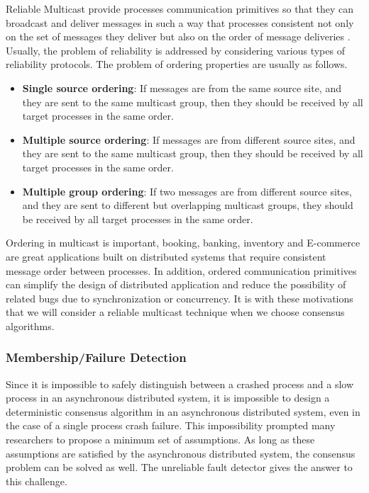\documentclass[12pt, a4paper]{article}
\begin{document}
Reliable Multicast provide processes communication primitives so that they can
broadcast and deliver messages in such a way that processes consistent not only
on the set of messages they deliver but also on the order of message deliveries
\cite{fritzke2001consensus}. Usually, the problem of reliability is addressed by
considering various types of reliability protocols. The problem of ordering
properties are usually as follows.\cite{garcia1991ordered}

\begin{itemize}
  \item \textbf{Single source ordering}: If messages are from the same source
  site, and they are sent to the same multicast group, then they should be
  received by all target processes in the same order.
  \item \textbf{Multiple source ordering}: If messages are from different
  source sites, and they are sent to the same multicast group,
  then they should be received by all target processes in the same order.
  \item \textbf{Multiple group ordering}: If two messages are from different
  source sites, and they are sent to different but overlapping multicast groups,
  they should be received by all target processes in the same order.
\end{itemize}

Ordering in multicast is important, booking, banking, inventory and E-commerce
are great applications built on distributed systems that require consistent
message order between processes. In addition, ordered communication primitives
can simplify the design of distributed application and reduce the possibility of
related bugs due to synchronization or concurrency\cite{garcia1991ordered}. It
is with these motivations that we will consider a reliable multicast technique
when we choose consensus algorithms.

\subsubsection{Membership/Failure Detection}

Since it is impossible to safely distinguish between a crashed process and a
slow process in an asynchronous distributed system, it is impossible to design
a deterministic consensus algorithm in an asynchronous distributed system, even
in the case of a single process crash failure\cite{fischer1985impossibility}.
This impossibility prompted many researchers to propose a minimum set of
assumptions. As long as these assumptions are satisfied by the asynchronous
distributed system, the consensus problem can be solved as well. The unreliable
fault detector gives the answer to this challenge\cite{chandra1996unreliable}.
\end{document}
